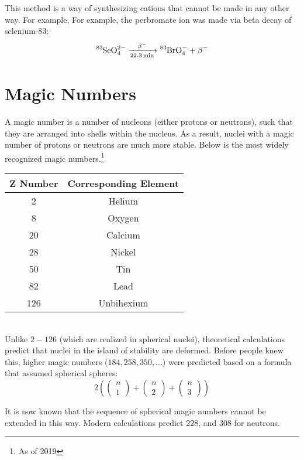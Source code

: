 \documentclass{article}
\begin{document}
\begin{multicols*}{2}
    This method is a way of synthesizing cations that cannot be made in any other way. For example,
    For example, the perbromate ion was made via beta decay of selenium-83:
    \[
      \ce{^{83}SeO^{2-}_{4} ->[\beta-][22.3min] ^{83}BrO^-_4 + \beta-}
    \]

    \section{Magic Numbers}
    A magic number is a number of nucleons (either protons or neutrons), such that they
    are arranged into shells within the nucleus. As a result, nuclei with a magic number of
    protons or neutrons are much more stable. Below is the most widely recognized magic numbers.\footnote{As of 2019}
    
    \begin{tabular}{|c|c|}
      \hline
      \textbf{Z Number} & \textbf{Corresponding Element} \\
      \hline
      2   & Helium  \\
      8   & Oxygen  \\
      20  & Calcium \\
      28  & Nickel  \\
      50  & Tin     \\
      82  & Lead    \\
      126 & Unbihexium \\
      \hline
    \end{tabular}\\


    Unlike $2-126$ (which are realized in spherical nuclei), theoretical calculations
    predict that nuclei in the island of stability are deformed. Before people knew this,
    higher magic numbers ($184, 258, 350, \ldots$) were predicted based on a formula
    that assumed spherical spheres:
    \[
      2\left(\begin{pmatrix}n\\ 1\end{pmatrix} + \begin{pmatrix}n\\ 2\end{pmatrix} + \begin{pmatrix}n\\ 3\end{pmatrix}\right)
    \]
    
    It is now known that the sequence of spherical magic numbers cannot be extended in this
    way. Modern calculations predict $228$, and $308$ for neutrons.


\end{multicols*}
\end{document}
